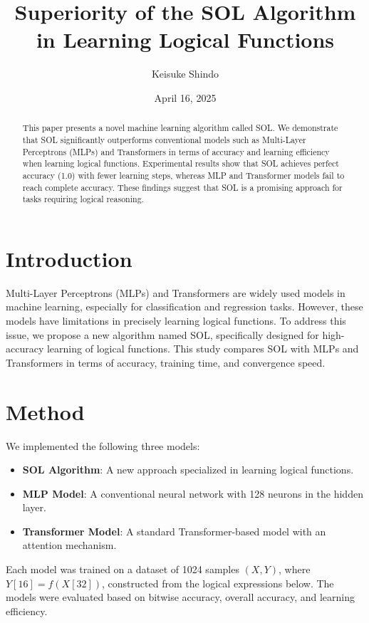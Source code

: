 \documentclass[11pt]{article}
\title{\bf Superiority of the SOL Algorithm in Learning Logical Functions}
\author{Keisuke Shindo}
\date{April 16, 2025}
\begin{document}
\maketitle

\begin{abstract}
This paper presents a novel machine learning algorithm called SOL. We demonstrate that SOL significantly outperforms conventional models such as Multi-Layer Perceptrons (MLPs) and Transformers in terms of accuracy and learning efficiency when learning logical functions. Experimental results show that SOL achieves perfect accuracy (1.0) with fewer learning steps, whereas MLP and Transformer models fail to reach complete accuracy. These findings suggest that SOL is a promising approach for tasks requiring logical reasoning.
\end{abstract}

\section{Introduction}
Multi-Layer Perceptrons (MLPs) and Transformers are widely used models in machine learning, especially for classification and regression tasks. However, these models have limitations in precisely learning logical functions. To address this issue, we propose a new algorithm named SOL, specifically designed for high-accuracy learning of logical functions. This study compares SOL with MLPs and Transformers in terms of accuracy, training time, and convergence speed.

\section{Method}
We implemented the following three models:

\begin{itemize}
    \item \textbf{SOL Algorithm}: A new approach specialized in learning logical functions.
    \item \textbf{MLP Model}: A conventional neural network with 128 neurons in the hidden layer.
    \item \textbf{Transformer Model}: A standard Transformer-based model with an attention mechanism.
\end{itemize}

Each model was trained on a dataset of 1024 samples $(X, Y)$, where $Y[16] = f(X[32])$, constructed from the logical expressions below. The models were evaluated based on bitwise accuracy, overall accuracy, and learning efficiency.
\end{document}
